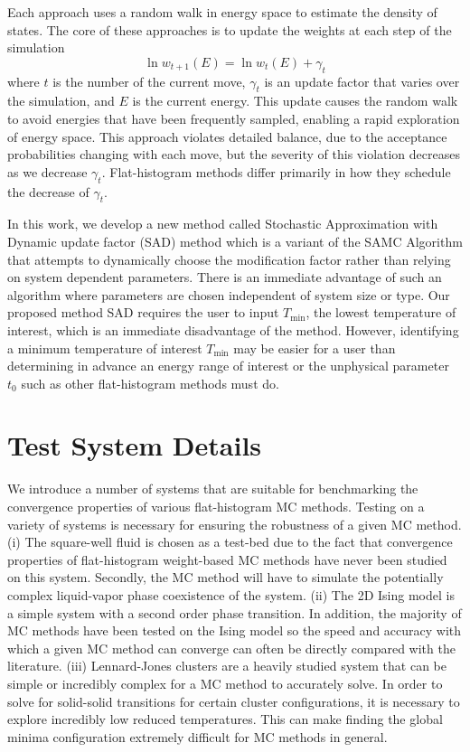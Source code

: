 Each approach uses a random walk in energy space to estimate the density of
states.  The core of these approaches is to update the weights at each step of
the simulation
\begin{equation}
	\ln{w_{t+1}(E)}=\ln{w_{t}(E)}
	+\gamma_t
\end{equation}
where $t$ is the number of the current move, $\gamma_t$ is an update factor
that varies over the simulation, and $E$ is the current energy.  This update
causes the random walk to avoid energies that have been frequently sampled,
enabling a rapid exploration of energy space. This approach violates detailed
balance, due to the acceptance probabilities changing with each move, but the
severity of this violation decreases as we decrease $\gamma_t$.  Flat-histogram
methods differ primarily in how they schedule the decrease of $\gamma_t$.

In this work, we develop a new method called Stochastic Approximation with
Dynamic update factor (SAD) method which is a variant of the SAMC Algorithm
that attempts to dynamically choose the modification factor rather than relying
on system dependent parameters. There is an immediate advantage of such an
algorithm where parameters are chosen independent of system size or type. Our
proposed method SAD requires the user to input $T_\text{min}$, the lowest
temperature of interest, which is an immediate disadvantage of the method.
However, identifying a minimum temperature of interest $T_\text{min}$ may be
easier for a user than determining in advance an energy range of interest or
the unphysical parameter $t_0$ such as other flat-histogram methods must do.


\section{Test System Details}
We introduce a number of systems that are suitable for benchmarking the
convergence properties of various flat-histogram MC methods. Testing on a
variety of systems is necessary for ensuring the robustness of a given MC
method. (i) The square-well fluid is chosen as a test-bed due to the fact that
convergence properties of flat-histogram weight-based MC methods have never
been studied on this system. Secondly, the MC method will have to simulate the
potentially complex liquid-vapor phase coexistence of the system. (ii) The 2D Ising
model is a simple system with a second order phase transition. In addition, the
majority of MC methods have been tested on the Ising model so the speed and
accuracy with which a given MC method can converge can often be directly
compared with the literature. (iii) Lennard-Jones clusters are a heavily studied
system that can be simple or incredibly complex for a MC method to accurately
solve. In order to solve for solid-solid transitions for certain cluster
configurations, it is necessary to explore incredibly low reduced temperatures.
This can make finding the global minima configuration extremely difficult for
MC methods in general.

